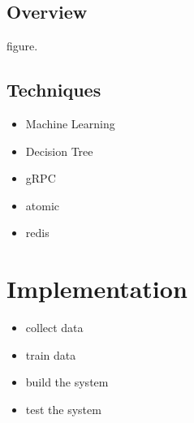 \documentclass[conference]{IEEEtran}
\begin{document}
\subsection{Overview}
figure.

\subsection{Techniques}

\begin{itemize}
    \item Machine Learning
    \item Decision Tree
    \item gRPC
    \item atomic
    \item redis 
\end{itemize}






\section{Implementation}
\begin{itemize}
    \item collect data
    \item train data
    \item build the system
    \item test the system
\end{itemize}


\end{document}
